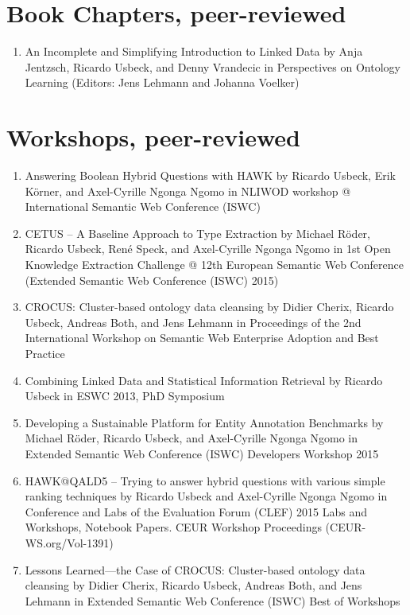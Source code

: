\section*{Book Chapters, peer-reviewed}
\begin{enumerate}[resume]
\item An Incomplete and Simplifying Introduction to Linked Data by Anja Jentzsch, Ricardo Usbeck, and Denny Vrandecic in Perspectives on Ontology Learning (Editors: Jens Lehmann and Johanna Voelker) 
\end{enumerate}


\section*{Workshops, peer-reviewed}
\begin{enumerate}[resume]
    \item Answering Boolean Hybrid Questions with HAWK by Ricardo Usbeck, Erik Körner, and Axel-Cyrille Ngonga Ngomo in NLIWOD workshop @ International Semantic Web Conference (ISWC)
    \item CETUS -- A Baseline Approach to Type Extraction by Michael Röder, Ricardo Usbeck, René Speck, and Axel-Cyrille Ngonga Ngomo in 1st Open Knowledge Extraction Challenge @ 12th European Semantic Web Conference (Extended Semantic Web Conference (ISWC) 2015) 
    \item CROCUS: Cluster-based ontology data cleansing by Didier Cherix, Ricardo Usbeck, Andreas Both, and Jens Lehmann in Proceedings of the 2nd International Workshop on Semantic Web Enterprise Adoption and Best Practice 
    \item Combining Linked Data and Statistical Information Retrieval by Ricardo Usbeck in ESWC 2013, PhD Symposium  
    \item Developing a Sustainable Platform for Entity Annotation Benchmarks by Michael Röder, Ricardo Usbeck, and Axel-Cyrille Ngonga Ngomo in Extended Semantic Web Conference (ISWC) Developers Workshop 2015 
    \item HAWK@QALD5 -- Trying to answer hybrid questions with various simple ranking techniques by Ricardo Usbeck and Axel-Cyrille Ngonga Ngomo in Conference and Labs of the Evaluation Forum (CLEF) 2015 Labs and Workshops, Notebook Papers. CEUR Workshop Proceedings (CEUR-WS.org/Vol-1391) 
    \item Lessons Learned---the Case of CROCUS: Cluster-based ontology data cleansing by Didier Cherix, Ricardo Usbeck, Andreas Both, and Jens Lehmann in Extended Semantic Web Conference (ISWC) Best of Workshops 
\end{enumerate}


